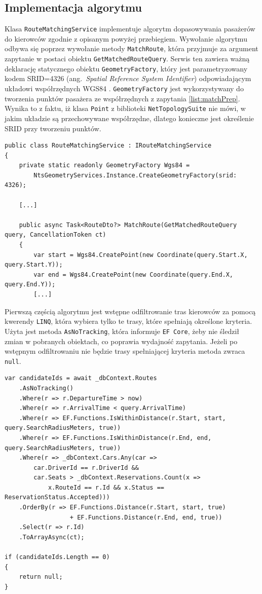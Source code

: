\subsection{Implementacja algorytmu}
Klasa \texttt{RouteMatchingService} implementuje algorytm dopasowywania pasażerów do kierowców zgodnie z opisanym powyżej przebiegiem.
Wywołanie algorytmu odbywa się poprzez wywołanie metody \texttt{MatchRoute}, która przyjmuje za argument zapytanie w postaci obiektu \texttt{GetMatchedRouteQuery}.
Serwis ten zawiera ważną deklarację statycznego obiektu \texttt{GeometryFactory}, który jest parametryzowany kodem SRID=4326 (ang.~\emph{Spatial Reference System Identifier}) odpowiadającym układowi współrzędnych WGS84 \cite{IAG_WGS84_2025}.
\texttt{GeometryFactory} jest wykorzystywany do tworzenia punktów pasażera ze współrzędnych z zapytania \ref{list:matchPrep}. 
Wynika to z faktu, iż klasa \texttt{Point} z biblioteki \texttt{NetTopologySuite} nie mówi, w jakim układzie są przechowywane współrzędne, dlatego konieczne jest określenie SRID przy tworzeniu punktów.
\begin{lstlisting}[label=list:matchPrep,caption=Przygotowanie serwisu RouteMatchingService,style=sharpcstyle]
public class RouteMatchingService : IRouteMatchingService
{
    private static readonly GeometryFactory Wgs84 =
        NtsGeometryServices.Instance.CreateGeometryFactory(srid: 4326);

    [...]

    public async Task<RouteDto?> MatchRoute(GetMatchedRouteQuery query, CancellationToken ct)
    {
        var start = Wgs84.CreatePoint(new Coordinate(query.Start.X, query.Start.Y));
        var end = Wgs84.CreatePoint(new Coordinate(query.End.X, query.End.Y));
        [...]

\end{lstlisting}

Pierwszą częścią algorytmu jest wstępne odfiltrowanie tras kierowców za pomocą kwerendy \texttt{LINQ}, która wybiera tylko te trasy, które spełniają określone kryteria.
Użyta jest metoda \texttt{AsNoTracking}, która informuje \texttt{EF Core}, żeby nie śledził zmian w pobranych obiektach, co poprawia wydajność zapytania.
Jeżeli po wstępnym odfiltrowaniu nie będzie trasy spełniającej kryteria metoda zwraca \texttt{null}.
\begin{lstlisting}[label=list:linqFilter,caption=Wstępne odfiltrowanie tras kierowców,style=sharpcstyle]
var candidateIds = await _dbContext.Routes
    .AsNoTracking()
    .Where(r => r.DepartureTime > now)
    .Where(r => r.ArrivalTime < query.ArrivalTime)
    .Where(r => EF.Functions.IsWithinDistance(r.Start, start, query.SearchRadiusMeters, true))
    .Where(r => EF.Functions.IsWithinDistance(r.End, end, query.SearchRadiusMeters, true))
    .Where(r => _dbContext.Cars.Any(car =>
        car.DriverId == r.DriverId &&
        car.Seats > _dbContext.Reservations.Count(x =>
            x.RouteId == r.Id && x.Status == ReservationStatus.Accepted)))
    .OrderBy(r => EF.Functions.Distance(r.Start, start, true)
                  + EF.Functions.Distance(r.End, end, true))
    .Select(r => r.Id)
    .ToArrayAsync(ct);

if (candidateIds.Length == 0)
{
    return null;
}
\end{lstlisting}

